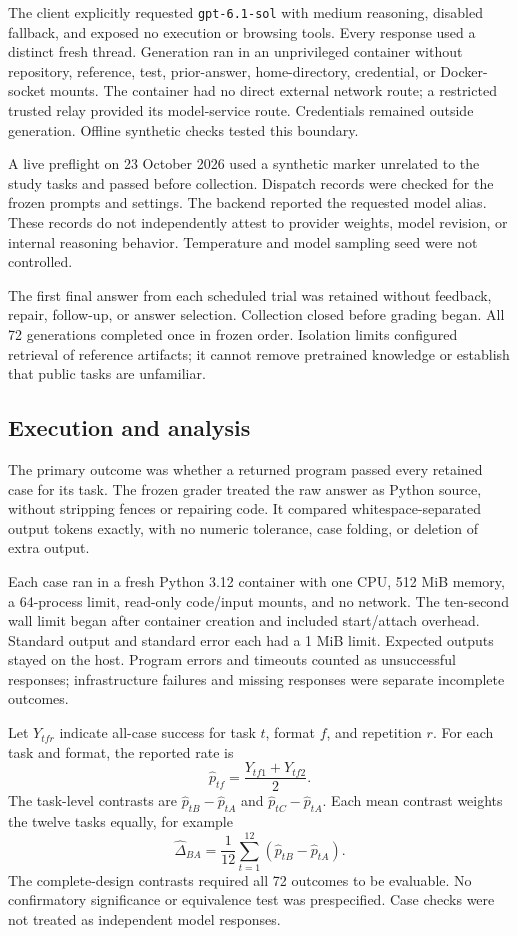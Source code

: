 \documentclass[conference,a4paper]{IEEEtran}
\newcommand{\model}{\texttt{gpt-6.1-sol}}
\begin{document}
The client explicitly requested \model{} with medium reasoning, disabled fallback, and exposed no execution or browsing tools. Every response used a distinct fresh thread. Generation ran in an unprivileged container without repository, reference, test, prior-answer, home-directory, credential, or Docker-socket mounts. The container had no direct external network route; a restricted trusted relay provided its model-service route. Credentials remained outside generation. Offline synthetic checks tested this boundary.

A live preflight on 23 October 2026 used a synthetic marker unrelated to the study tasks and passed before collection. Dispatch records were checked for the frozen prompts and settings. The backend reported the requested model alias. These records do not independently attest to provider weights, model revision, or internal reasoning behavior. Temperature and model sampling seed were not controlled.

The first final answer from each scheduled trial was retained without feedback, repair, follow-up, or answer selection. Collection closed before grading began. All 72 generations completed once in frozen order. Isolation limits configured retrieval of reference artifacts; it cannot remove pretrained knowledge or establish that public tasks are unfamiliar.

\subsection{Execution and analysis}
The primary outcome was whether a returned program passed every retained case for its task. The frozen grader treated the raw answer as Python source, without stripping fences or repairing code. It compared whitespace-separated output tokens exactly, with no numeric tolerance, case folding, or deletion of extra output.

Each case ran in a fresh Python 3.12 container with one CPU, 512 MiB memory, a 64-process limit, read-only code/input mounts, and no network. The ten-second wall limit began after container creation and included start/attach overhead. Standard output and standard error each had a 1 MiB limit. Expected outputs stayed on the host. Program errors and timeouts counted as unsuccessful responses; infrastructure failures and missing responses were separate incomplete outcomes.

Let $Y_{tfr}$ indicate all-case success for task $t$, format $f$, and repetition $r$. For each task and format, the reported rate is
\begin{equation}
\widehat p_{tf}=\frac{Y_{tf1}+Y_{tf2}}{2}.
\end{equation}
The task-level contrasts are $\widehat p_{tB}-\widehat p_{tA}$ and $\widehat p_{tC}-\widehat p_{tA}$. Each mean contrast weights the twelve tasks equally, for example
\begin{equation}
\widehat\Delta_{BA}=\frac{1}{12}\sum_{t=1}^{12}
(\widehat p_{tB}-\widehat p_{tA}).
\end{equation}
The complete-design contrasts required all 72 outcomes to be evaluable. No confirmatory significance or equivalence test was prespecified. Case checks were not treated as independent model responses.
\end{document}
